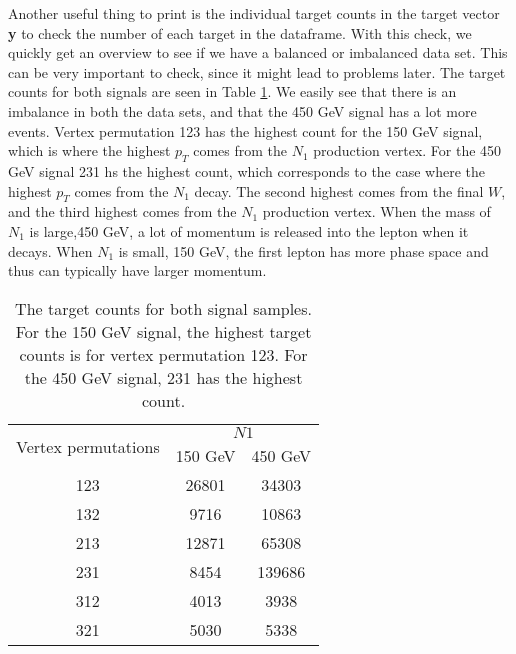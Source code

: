 \documentclass[a4paper, american, 12pt]{report}
\begin{document}
	Another useful thing to print is the individual target counts in the target vector \textbf{y} to check the number of each target in the dataframe. With this check, we quickly get an overview to see if we have a balanced or imbalanced data set. This can be very important to check, since it might lead to problems later. The target counts for both signals are seen in Table \ref{tab:Counts_original}. We easily see that there is an imbalance in both the data sets, and that the 450 GeV signal has a lot more events. Vertex permutation 123 has the highest count for the 150 GeV signal, which is where the highest $p_T$ comes from the $N_1$ production vertex. For the 450 GeV signal 231 hs the highest count, which corresponds to the case where the highest $p_T$ comes from the $N_1$ decay. The second highest comes from the final $W$, and the third highest comes from the $N_1$ production vertex. When the mass of $N_1$ is large,450 GeV, a lot of momentum is released into the lepton when it decays. When $N_1$ is small, 150 GeV, the first lepton has more phase space and thus can typically have larger momentum.
	\begin{table}[ht!]
		\centering
		\begin{tabular}{ |c|c|c| }
			\hline
			\multirow{2}{*}{Vertex permutations} & \multicolumn{2}{|c|}{$N1$}\\
			\cline{2-3} \rule{0pt}{13pt}
			 & 150 GeV & 450 GeV  \\
			\hline \rule{0pt}{13pt}
			123 & 26801 & 34303 \\
			\hline \rule{0pt}{13pt}
			132 & 9716 & 10863 \\
			\hline \rule{0pt}{13pt}
			213 & 12871 & 65308 \\
			\hline \rule{0pt}{13pt}
			231 & 8454 & 139686 \\
			\hline \rule{0pt}{13pt}
			312 & 4013 & 3938 \\
			\hline \rule{0pt}{13pt}
			321 & 5030 & 5338 \\
			\hline
		\end{tabular}	
		\caption[Target counts of the classes.]{The target counts for both signal samples. For the 150 GeV signal, the highest target counts is for vertex permutation 123. For the 450 GeV signal, 231 has the highest count.}
		\label{tab:Counts_original}
	\end{table}
	
	
\end{document}
